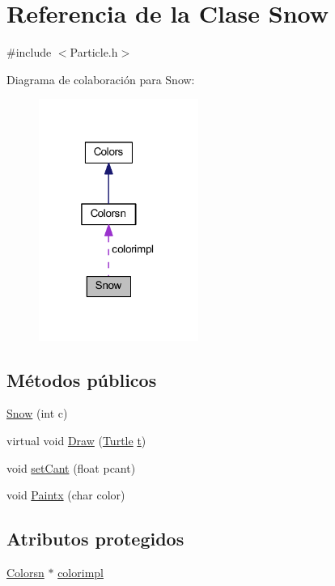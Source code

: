 \hypertarget{class_snow}{}\section{Referencia de la Clase Snow}
\label{class_snow}


{\ttfamily \#include $<$Particle.\+h$>$}



Diagrama de colaboración para Snow\+:
\nopagebreak
\begin{figure}[H]
\begin{center}
\leavevmode
\includegraphics[width=148pt]{class_snow__coll__graph}
\end{center}
\end{figure}
\subsection*{Métodos públicos}
\begin{DoxyCompactItemize}
\item 
\mbox{\hyperlink{class_snow_ac696d06b015958c09d5fbb13d02bf8b6}{Snow}} (int c)
\item 
virtual void \mbox{\hyperlink{class_snow_a4c8865c8e6ad4db203332acc90b65e85}{Draw}} (\mbox{\hyperlink{class_turtle}{Turtle}} \mbox{\hyperlink{_abstract_8cpp_a87833ae07d42f160626b6355cd9f8cf0}{t}})
\item 
void \mbox{\hyperlink{class_snow_a6f548af958d4f69411ec04fa16b2dc70}{set\+Cant}} (float pcant)
\item 
void \mbox{\hyperlink{class_snow_a7e6b8cdef24b96f3e0d5e4d4d672985f}{Paintx}} (char color)
\end{DoxyCompactItemize}
\subsection*{Atributos protegidos}
\begin{DoxyCompactItemize}
\item 
\mbox{\hyperlink{class_colorsn}{Colorsn}} $\ast$ \mbox{\hyperlink{class_snow_a9d3814c830ebd32de04f5b03c8a978ae}{colorimpl}}
\end{DoxyCompactItemize}



